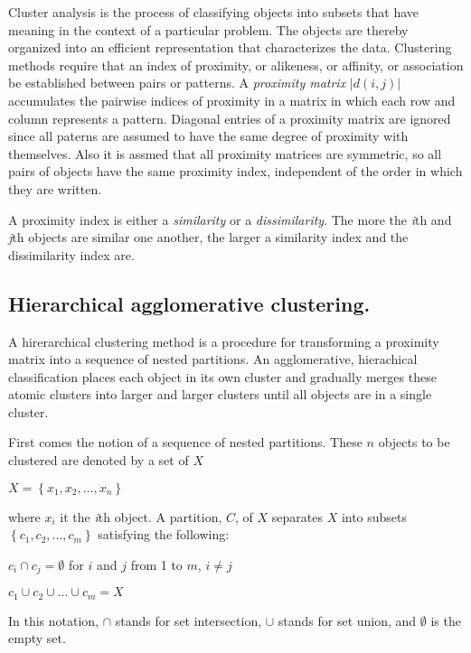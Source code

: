 Cluster analysis is the process of classifying objects into subsets that have meaning in the context of a particular problem. The objects are thereby organized into an efficient representation that characterizes the data. Clustering methods require that an index of proximity, or alikeness, or affinity, or association be established between pairs or patterns. A \textit{proximity matrix} $|d(i, j)|$ accumulates the pairwise indices of proximity in a matrix in which each row and column represents a pattern. Diagonal entries of a proximity matrix are ignored since all paterns are assumed to have the same degree of proximity with themselves. Also it is assmed that all proximity matrices are symmetric, so all pairs of objects have the same proximity index, independent of the order in which they are written.

A proximity index is either a \textit{similarity} or a \textit{dissimilarity}. The more the \textit{i}th and \textit{j}th objects are similar one another, the larger a similarity index and the dissimilarity index are.

\subsection{Hierarchical agglomerative clustering.}

A hirerarchical clustering method is a procedure for transforming a proximity matrix into a sequence of nested partitions. An agglomerative, hierachical classification places each object in its own cluster and gradually merges these atomic clusters into larger and larger clusters until all objects are in a single cluster. 

First comes the notion of a sequence of nested partitions. These $n$ objects to be clustered are denoted by a set of $X$ \\
\centerline{$X = \left \{ x_1, x_2, ..., x_n \right \}$}

where $x_i$ it the \textit{i}th object. A partition, $C$, of $X$ separates $X$ into subsets $\left \{ c_1, c_2, ..., c_m \right \}$ satisfying the following:

\centerline{\hspace*{-5cm} $c_i \cap c_j = \emptyset$ for $i$ and $j$ from 1 to $m$, $i \neq j$}
\centerline{\hspace*{-8.3cm} $c_1 \cup c_2 \cup ... \cup c_m = X$}

In this notation, $\cap$ stands for set intersection, $\cup$ stands for set union, and $\emptyset$ is the empty set. 

